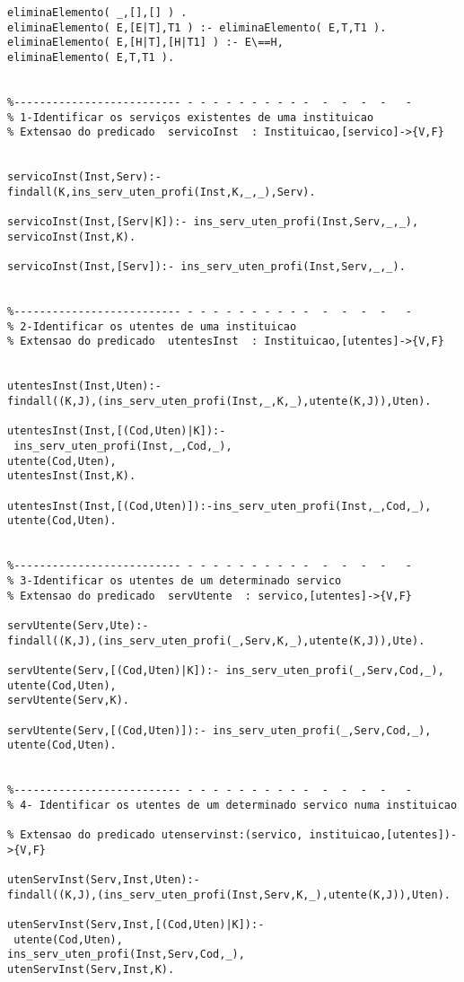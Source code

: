 \documentclass[pdftex,12pt,a4paper]{report}
\begin{document}
\begin{appendices}
\begin{Verbatim}
eliminaElemento( _,[],[] ) .
eliminaElemento( E,[E|T],T1 ) :- eliminaElemento( E,T,T1 ).
eliminaElemento( E,[H|T],[H|T1] ) :- E\==H,
eliminaElemento( E,T,T1 ).


%-------------------------- - - - - - - - - - -  -  -  -  -   -         
% 1-Identificar os serviços existentes de uma instituicao
% Extensao do predicado  servicoInst  : Instituicao,[servico]->{V,F}


servicoInst(Inst,Serv):-findall(K,ins_serv_uten_profi(Inst,K,_,_),Serv).      

servicoInst(Inst,[Serv|K]):- ins_serv_uten_profi(Inst,Serv,_,_),
servicoInst(Inst,K).

servicoInst(Inst,[Serv]):- ins_serv_uten_profi(Inst,Serv,_,_).


%-------------------------- - - - - - - - - - -  -  -  -  -   -         
% 2-Identificar os utentes de uma instituicao
% Extensao do predicado  utentesInst  : Instituicao,[utentes]->{V,F}


utentesInst(Inst,Uten):-
findall((K,J),(ins_serv_uten_profi(Inst,_,K,_),utente(K,J)),Uten).      

utentesInst(Inst,[(Cod,Uten)|K]):-
 ins_serv_uten_profi(Inst,_,Cod,_),
utente(Cod,Uten),
utentesInst(Inst,K).

utentesInst(Inst,[(Cod,Uten)]):-ins_serv_uten_profi(Inst,_,Cod,_),
utente(Cod,Uten).


%-------------------------- - - - - - - - - - -  -  -  -  -   -         
% 3-Identificar os utentes de um determinado servico
% Extensao do predicado  servUtente  : servico,[utentes]->{V,F}

servUtente(Serv,Ute):-
findall((K,J),(ins_serv_uten_profi(_,Serv,K,_),utente(K,J)),Ute).

servUtente(Serv,[(Cod,Uten)|K]):- ins_serv_uten_profi(_,Serv,Cod,_),
utente(Cod,Uten), 
servUtente(Serv,K).

servUtente(Serv,[(Cod,Uten)]):- ins_serv_uten_profi(_,Serv,Cod,_),
utente(Cod,Uten).


%-------------------------- - - - - - - - - - -  -  -  -  -   -
% 4- Identificar os utentes de um determinado servico numa instituicao

% Extensao do predicado utenservinst:(servico, instituicao,[utentes])->{V,F}

utenServInst(Serv,Inst,Uten):- 
findall((K,J),(ins_serv_uten_profi(Inst,Serv,K,_),utente(K,J)),Uten). 

utenServInst(Serv,Inst,[(Cod,Uten)|K]):-
 utente(Cod,Uten),
ins_serv_uten_profi(Inst,Serv,Cod,_),
utenServInst(Serv,Inst,K).


\end{Verbatim}
\end{appendices}
\end{document}

